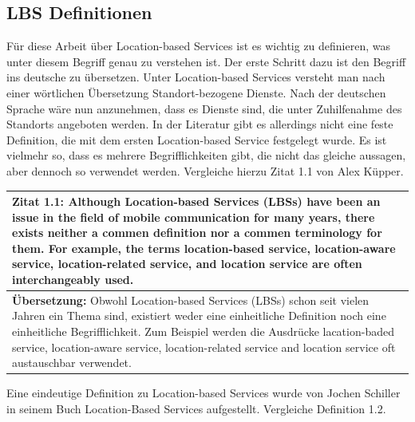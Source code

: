 \subsection{LBS Definitionen}





Für diese Arbeit über Location-based Services ist es wichtig zu definieren, was unter diesem Begriff genau zu verstehen ist. Der erste Schritt dazu ist den Begriff ins deutsche zu übersetzen. Unter Location-based Services versteht man nach einer wörtlichen Übersetzung Standort-bezogene Dienste. Nach der deutschen Sprache wäre nun anzunehmen, dass es Dienste sind, die unter Zuhilfenahme des Standorts angeboten werden. In der Literatur gibt es allerdings nicht eine feste Definition, die mit dem ersten Location-based Service festgelegt wurde. Es ist vielmehr so, dass es mehrere Begrifflichkeiten gibt, die nicht das gleiche aussagen, aber dennoch so verwendet werden. Vergleiche hierzu Zitat 1.1 von Alex Küpper.

\begin{table}[h]
	\centering
	\begin{tabular}{|p{16cm}|}\hline
		\textbf{Zitat 1.1:} \glqq Although Location-based Services (LBSs) have been an issue in the field of mobile communication for many years, there exists neither a commen definition nor a commen terminology for them. For example, the terms location-based service, location-aware service, location-related service, and location service are often interchangeably used. \cite[S.1]{Kuepper2005} \\ \hline
		\textbf{Übersetzung:} Obwohl Location-based Services (LBSs) schon seit vielen Jahren ein Thema sind, existiert weder eine einheitliche Definition noch eine einheitliche Begrifflichkeit. Zum Beispiel werden die Ausdrücke lacation-baded service, location-aware service, location-related service and location service oft austauschbar verwendet. \\ \hline
	\end{tabular}
\end{table}


Eine eindeutige Definition zu Location-based Services wurde von Jochen Schiller in seinem Buch \glqq Location-Based Services \grqq aufgestellt. Vergleiche Definition 1.2.

